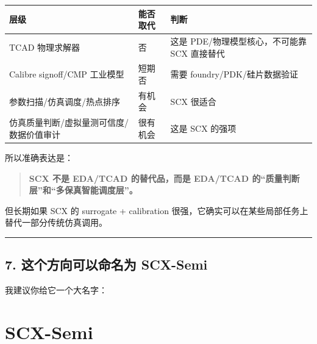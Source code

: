 \documentclass[
  12pt,
]{ctexart}
\begin{document}
\begin{longtable}[]{@{}
  >{\raggedright\arraybackslash}p{}
  >{\raggedleft\arraybackslash}p{}
  >{\raggedright\arraybackslash}p{}@{}}
\toprule\noalign{}
\begin{minipage}[b]{\linewidth}\raggedright
层级
\end{minipage} & \begin{minipage}[b]{\linewidth}\raggedleft
能否取代
\end{minipage} & \begin{minipage}[b]{\linewidth}\raggedright
判断
\end{minipage} \\
\midrule\noalign{}
\endhead
\bottomrule\noalign{}
\endlastfoot
TCAD 物理求解器 & 否 & 这是 PDE/物理模型核心，不可能靠 SCX 直接替代 \\
Calibre signoff/CMP 工业模型 & 短期否 & 需要 foundry/PDK/硅片数据验证 \\
参数扫描/仿真调度/热点排序 & 有机会 & SCX 很适合 \\
仿真质量判断/虚拟量测可信度/数据价值审计 & 很有机会 & 这是 SCX 的强项 \\
\end{longtable}

所以准确表达是：

\begin{quote}
\textbf{SCX 不是 EDA/TCAD 的替代品，而是 EDA/TCAD
的``质量判断层''和``多保真智能调度层''。}
\end{quote}

但长期如果 SCX 的 surrogate + calibration
很强，它确实可以在某些局部任务上替代一部分传统仿真调用。

\begin{center}\rule{0.5\linewidth}{0.5pt}\end{center}

\subsection{7. 这个方向可以命名为
SCX-Semi}\label{ux8fd9ux4e2aux65b9ux5411ux53efux4ee5ux547dux540dux4e3a-scx-semi}

我建议你给它一个大名字：

\section{\texorpdfstring{\textbf{SCX-Semi}}{SCX-Semi}}\label{scx-semi}
\end{document}
